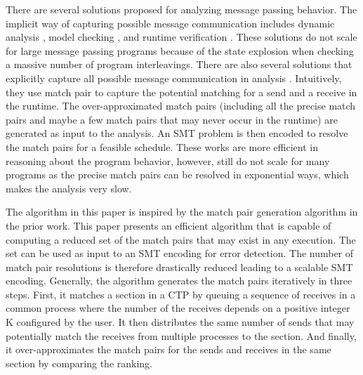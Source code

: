 There are several solutions proposed for analyzing message passing behavior. The implicit way of capturing possible message communication includes dynamic analysis \cite{DBLP:conf/ppopp/VakkalankaSGK08,DBLP:conf/sbmf/SharmaGB12}, model checking \cite{DBLP:conf/vmcai/Siegel07,DBLP:conf/pvm/Siegel07}, and runtime verification \cite{DBLP:conf/sc/VetterS00,DBLP:conf/parco/KrammerBMR03,DBLP:conf/ptw/HilbrichSSM09}. These solutions do not scale for large message passing programs because of the state explosion when checking a massive number of program interleavings. There are also several solutions that explicitly capture all possible message communication in analysis \cite{DBLP:conf/kbse/HuangMM13,HuangNFM15,HuangDeadlock,DBLP:conf/fm/ForejtKNS14}. Intuitively, they use match pair to capture the potential matching for a send and a receive in the runtime. 
The over-approximated match pairs (including all the precise match pairs and maybe a few match pairs that may never occur in the runtime) are generated as input to the analysis.
An SMT problem is then encoded to resolve the match pairs for a feasible schedule. 
These works are more efficient in reasoning about the program behavior, however, still do not scale for many programs as the precise match pairs can be resolved in exponential ways, which makes the analysis very slow.  

The algorithm in this paper is inspired by the match pair generation algorithm in the prior work.
This paper presents an efficient algorithm that is capable of computing a reduced set of the match pairs that may exist in any execution. The set can be used as input to an SMT encoding for error detection. The number of match pair resolutions is therefore drastically reduced leading to a scalable SMT encoding. Generally, the algorithm generates the match pairs iteratively in three steps. First, it matches a section in a CTP by queuing a sequence of receives in a common process where the number of the receives depends on a positive integer K configured by the user. It then distributes the same number of sends that may potentially match the receives from multiple processes to the section. And finally, it over-approximates the match pairs for the sends and receives in the same section by comparing the ranking. 


